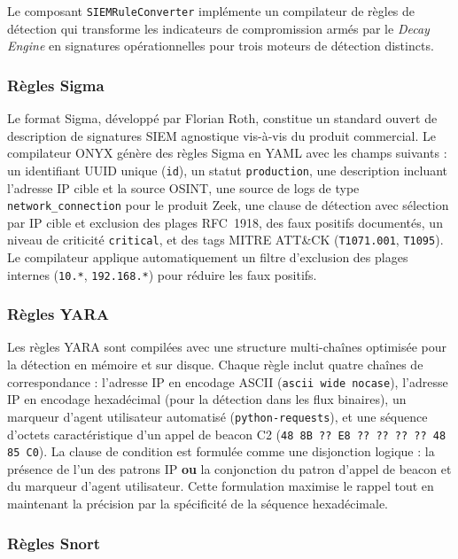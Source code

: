 Le composant \texttt{SIEMRuleConverter} implémente un compilateur de règles de détection qui transforme les indicateurs de compromission armés par le \textit{Decay Engine} en signatures opérationnelles pour trois moteurs de détection distincts.

\subsubsection{Règles Sigma}

Le format Sigma, développé par Florian Roth, constitue un standard ouvert de description de signatures SIEM agnostique vis-à-vis du produit commercial. Le compilateur ONYX génère des règles Sigma en YAML avec les champs suivants : un identifiant UUID unique (\texttt{id}), un statut \texttt{production}, une description incluant l'adresse IP cible et la source OSINT, une source de logs de type \texttt{network\_connection} pour le produit Zeek, une clause de détection avec sélection par IP cible et exclusion des plages RFC~1918, des faux positifs documentés, un niveau de criticité \texttt{critical}, et des tags MITRE ATT\&CK (\texttt{T1071.001}, \texttt{T1095}). Le compilateur applique automatiquement un filtre d'exclusion des plages internes (\texttt{10.*}, \texttt{192.168.*}) pour réduire les faux positifs.

\subsubsection{Règles YARA}

Les règles YARA sont compilées avec une structure multi-chaînes optimisée pour la détection en mémoire et sur disque. Chaque règle inclut quatre chaînes de correspondance : l'adresse IP en encodage ASCII (\texttt{ascii wide nocase}), l'adresse IP en encodage hexadécimal (pour la détection dans les flux binaires), un marqueur d'agent utilisateur automatisé (\texttt{python-requests}), et une séquence d'octets caractéristique d'un appel de beacon C2 (\texttt{48 8B ?? E8 ?? ?? ?? ?? 48 85 C0}). La clause de condition est formulée comme une disjonction logique : la présence de l'un des patrons IP \textbf{ou} la conjonction du patron d'appel de beacon et du marqueur d'agent utilisateur. Cette formulation maximise le rappel tout en maintenant la précision par la spécificité de la séquence hexadécimale.

\subsubsection{Règles Snort}

